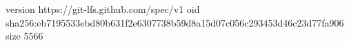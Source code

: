 version https://git-lfs.github.com/spec/v1
oid sha256:eb7195533ebd80b631f2e6307738b59d8a15d07c056c293453d46c23d77fa906
size 5566
